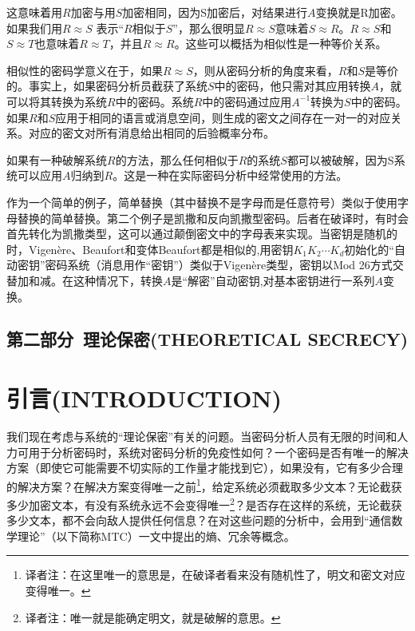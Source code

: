 \documentclass[]{article}
\begin{document}
这意味着用$R$加密与用$S$加密相同，因为S加密后，对结果进行$A$变换就是R加密。如果我们用$R\approx S$ 表示“$R$相似于$S$”，那么很明显$R\approx S$意味着$S\approx R$。$R\approx S$和$S\approx T$也意味着$R\approx T$，并且$R\approx R$。这些可以概括为相似性是一种等价关系。

相似性的密码学意义在于，如果$R\approx S$，则从密码分析的角度来看，$R$和$S$是等价的。事实上，如果密码分析员截获了系统$S$中的密码，他只需对其应用转换$A$，就可以将其转换为系统$R$中的密码。系统$R$中的密码通过应用$A^{-1}$转换为$S$中的密码。如果$R$和$S$应用于相同的语言或消息空间，则生成的密文之间存在一对一的对应关系。对应的密文对所有消息给出相同的后验概率分布。

如果有一种破解系统$R$的方法，那么任何相似于$R$的系统$S$都可以被破解，因为S系统可以应用$A$归纳到$R$。这是一种在实际密码分析中经常使用的方法。

作为一个简单的例子，简单替换（其中替换不是字母而是任意符号）类似于使用字母替换的简单替换。第二个例子是凯撒和反向凯撒型密码。后者在破译时，有时会首先转化为凯撒类型，这可以通过颠倒密文中的字母表来实现。当密钥是随机的时，Vigen\`{e}re、Beaufort和变体Beaufort都是相似的,用密钥$K_1 K_2\cdots K_d$初始化的“自动密钥”密码系统（消息用作“密钥”）类似于Vigen\`{e}re类型，密钥以Mod 26方式交替加和减。在这种情况下，转换$A$是“解密”自动密钥,对基本密钥进行一系列$A$变换。

\newpage

\begin{center}
	\section*{第二部分\ 理论保密(THEORETICAL SECRECY)}
\end{center}

%   
%

\section{引言(INTRODUCTION)}

我们现在考虑与系统的“理论保密”有关的问题。当密码分析人员有无限的时间和人力可用于分析密码时，系统对密码分析的免疫性如何？一个密码是否有唯一的解决方案（即使它可能需要不切实际的工作量才能找到它），如果没有，它有多少合理的解决方案？在解决方案变得唯一之前\footnote{译者注：在这里唯一的意思是，在破译者看来没有随机性了，明文和密文对应变得唯一。}，给定系统必须截取多少文本？无论截获多少加密文本，有没有系统永远不会变得唯一\footnote{译者注：唯一就是能确定明文，就是破解的意思。}？是否存在这样的系统，无论截获多少文本，都不会向敌人提供任何信息？在对这些问题的分析中，会用到“通信数学理论”（以下简称MTC）一文中提出的熵、冗余等概念。
\end{document}
